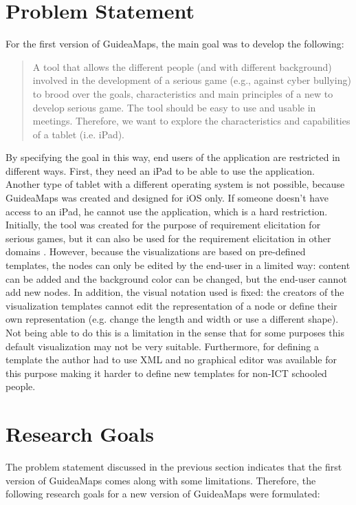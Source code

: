 \section{Problem Statement}\label{sec:problem-statement}
For the first version of GuideaMaps, the main goal was to develop the following:

\begin{quote}
A tool that allows the different people (and with different background) involved in the development of a serious game (e.g., against cyber bullying) to brood over the goals, characteristics and main principles of a new to develop serious game. The tool should be easy to use and usable in meetings. Therefore, we want to explore the characteristics and capabilities of a tablet (i.e. iPad). \hfill \citep{erikjanssens}
\end{quote}

By specifying the goal in this way, end users of the application are restricted in different ways. First, they need an iPad to be able to use the application. Another type of tablet with a different operating system is not possible, because GuideaMaps was created and designed for iOS only. If someone doesn't have access to an iPad, he cannot use the application, which is a hard restriction. \\

Initially, the tool was created for the purpose of requirement elicitation for serious games, but it can also be used for the requirement elicitation in other domains \citep{detroyerjanssens}. However, because the visualizations are based on pre-defined templates, the nodes can only be edited by the end-user in a limited way: content can be added and the background color can be changed, but the end-user cannot add new nodes. In addition, the visual notation used is fixed: the creators of the visualization templates cannot edit the representation of a node or define their own representation (e.g. change the length and width or use a different shape). Not being able to do this is a limitation in the sense that for some purposes this default visualization may not be very suitable. Furthermore, for defining a template the author had to use XML and no graphical editor was available for this purpose making it harder to define new templates for non-ICT schooled people.

\section{Research Goals}\label{sec:research-goals}
The problem statement discussed in the previous section indicates that the first version of GuideaMaps comes along with some limitations. Therefore, the following research goals for a new version of GuideaMaps were formulated:

